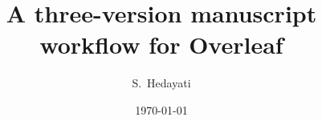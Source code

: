 
\usepackage[T1]{fontenc}
\usepackage[utf8]{inputenc}
\usepackage[margin=2.6cm]{geometry}
\usepackage{amsmath,amssymb}
\usepackage{graphicx}
\usepackage{booktabs}
\usepackage[colorlinks=true,allcolors=black!70]{hyperref}

\title{A three-version manuscript workflow for Overleaf}
\author{S.\ Hedayati}
\date{\today}
